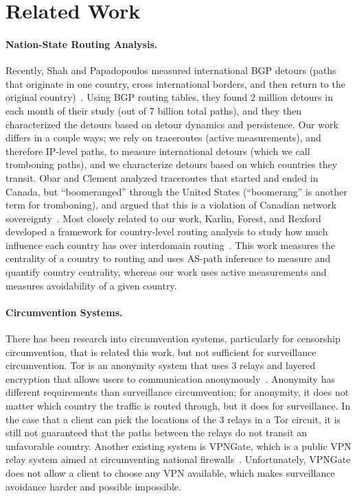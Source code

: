 \section{Related Work}
\label{related}

\paragraph{Nation-State Routing Analysis.}  Recently, Shah and Papadopoulos measured international BGP detours (paths that originate in one country, cross international borders, and then return to the original country)~\cite{shah2015characterizing}.  Using BGP routing tables, they found 2 million detours in each month of their study (out of 7 billion total paths), and they then characterized the detours based on detour dynamics and persistence.  Our work differs in a couple ways; we rely on traceroutes (active measurements), and therefore IP-level paths, to measure international detours (which we call tromboning paths), and we characterize detours based on which countries they transit.  Obar and Clement analyzed traceroutes that started and ended in Canada, but ``boomeranged'' through the United States (``boomerang'' is another term for tromboning), and argued that this is a violation of Canadian network sovereignty~\cite{obar2012internet}.  Most closely related to our work, Karlin, Forest, and Rexford developed a framework for country-level routing analysis to study how much influence each country has over interdomain routing~\cite{karlin2009nation}.  This work measures the centrality of a country to routing and uses AS-path inference to measure and quantify country centrality, whereas our work uses active measurements and measures avoidability of a given country.

\paragraph{Circumvention Systems.}  There has been research into circumvention systems, particularly for censorship circumvention, that is related this work, but not sufficient for surveillance circumvention.  Tor is an anonymity system that uses 3 relays and layered encryption that allows users to communication anonymously~\cite{dingledine2004tor}.  Anonymity has different requirements than surveillance circumvention; for anonymity, it does not matter which country the traffic is routed through, but it does for surveillance.  In the case that a client can pick the locations of the 3 relays in a Tor circuit, it is still not guaranteed that the paths between the relays do not transit an unfavorable country.  Another existing system is VPNGate, which is a public VPN relay system aimed at circumventing national firewalls~\cite{nobori2014vpn}.  Unfortunately, VPNGate does not allow a client to choose any VPN available, which makes surveillance avoidance harder and possible impossible.

